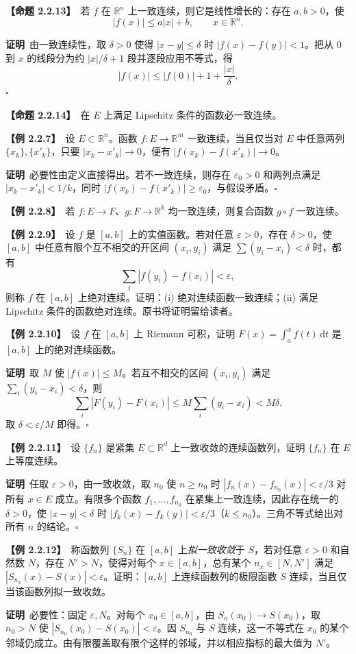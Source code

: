 \documentclass[UTF8,a4paper,11pt]{ctexart}
\newcommand{\ex}[1]{\par\medskip\noindent\textbf{【例 #1】}\ }
\newcommand{\prop}[1]{\par\medskip\noindent\textbf{【命题 #1】}\ }
\newcommand{\pf}{\par\noindent\textbf{证明}\ }
\begin{document}
\prop{2.2.13}若 $f$ 在 $\mathbb R^n$ 上一致连续，则它是线性增长的：存在 $a,b>0$，使
\[
|f(x)|\le a|x|+b,\qquad x\in\mathbb R^n.
\]
\pf 由一致连续性，取 $\delta>0$ 使得 $|x-y|\le\delta$ 时 $|f(x)-f(y)|<1$。把从 $0$ 到 $x$ 的线段分为约 $|x|/\delta+1$ 段并逐段应用不等式，得
\[
|f(x)|\le|f(0)|+1+\frac{|x|}{\delta}.
\]\hfill$\square$

\prop{2.2.14}在 $E$ 上满足 Lipschitz 条件的函数必一致连续。

\ex{2.2.7}设 $E\subset\mathbb R^n$。函数 $f:E\to\mathbb R^m$ 一致连续，当且仅当对 $E$ 中任意两列 $\{x_k\},\{x'_k\}$，只要 $|x_k-x'_k|\to0$，便有 $|f(x_k)-f(x'_k)|\to0$。
\pf 必要性由定义直接得出。若不一致连续，则存在 $\varepsilon_0>0$ 和两列点满足 $|x_k-x'_k|<1/k$，同时 $|f(x_k)-f(x'_k)|\ge\varepsilon_0$，与假设矛盾。\hfill$\square$

\ex{2.2.8}若 $f:E\to F$、$g:F\to\mathbb R^k$ 均一致连续，则复合函数 $g\circ f$ 一致连续。

\ex{2.2.9}设 $f$ 是 $[a,b]$ 上的实值函数。若对任意 $\varepsilon>0$，存在 $\delta>0$，使 $[a,b]$ 中任意有限个互不相交的开区间 $(x_i,y_i)$ 满足 $\sum(y_i-x_i)<\delta$ 时，都有
\[
\sum_i|f(y_i)-f(x_i)|<\varepsilon,
\]
则称 $f$ 在 $[a,b]$ 上绝对连续。证明：(i) 绝对连续函数一致连续；(ii) 满足 Lipschitz 条件的函数绝对连续。原书将证明留给读者。

\ex{2.2.10}设 $f$ 在 $[a,b]$ 上 Riemann 可积，证明 $F(x)=\int_a^x f(t)\,\mathrm dt$ 是 $[a,b]$ 上的绝对连续函数。
\pf 取 $M$ 使 $|f(x)|\le M$。若互不相交的区间 $(x_i,y_i)$ 满足 $\sum_i(y_i-x_i)<\delta$，则
\[
\sum_i|F(y_i)-F(x_i)|
\le M\sum_i(y_i-x_i)<M\delta.
\]
取 $\delta<\varepsilon/M$ 即得。\hfill$\square$

\ex{2.2.11}设 $\{f_n\}$ 是紧集 $E\subset\mathbb R^d$ 上一致收敛的连续函数列，证明 $\{f_n\}$ 在 $E$ 上等度连续。
\pf 任取 $\varepsilon>0$，由一致收敛，取 $n_0$ 使 $n\ge n_0$ 时 $|f_n(x)-f_{n_0}(x)|<\varepsilon/3$ 对所有 $x\in E$ 成立。有限多个函数 $f_1,\ldots,f_{n_0}$ 在紧集上一致连续，因此存在统一的 $\delta>0$，使 $|x-y|<\delta$ 时 $|f_k(x)-f_k(y)|<\varepsilon/3$（$k\le n_0$）。三角不等式给出对所有 $n$ 的结论。\hfill$\square$

\ex{2.2.12}称函数列 $\{S_n\}$ 在 $[a,b]$ 上\emph{拟一致收敛}于 $S$，若对任意 $\varepsilon>0$ 和自然数 $N$，存在 $N'>N$，使得对每个 $x\in[a,b]$，总有某个 $n_x\in[N,N']$ 满足 $|S_{n_x}(x)-S(x)|<\varepsilon$。证明：$[a,b]$ 上连续函数列的极限函数 $S$ 连续，当且仅当该函数列拟一致收敛。
\pf 必要性：固定 $\varepsilon,N$。对每个 $x_0\in[a,b]$，由 $S_n(x_0)\to S(x_0)$，取 $n_0>N$ 使 $|S_{n_0}(x_0)-S(x_0)|<\varepsilon$。因 $S_{n_0}$ 与 $S$ 连续，这一不等式在 $x_0$ 的某个邻域仍成立。由有限覆盖取有限个这样的邻域，并以相应指标的最大值为 $N'$。
\end{document}
